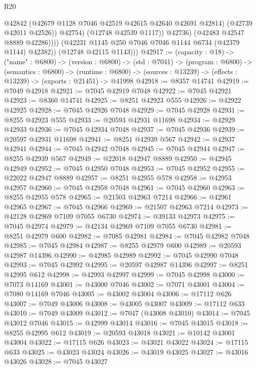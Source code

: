 \begin{lexlean}{R20}
\begin{coremodule}
{                        @42842
                        (@42679 @1128 @7046 @42519 @42615 @42640 @42691 @42814)
                        (@42739 @42011 @42526))
                      @42754)
                    (@12748 @42539 @1117))
                  @42736)
                (@42483 @42547 @8889 @42286))))
          (@42231 @1145 @250 @7046 @7046 @1144 @6734 (@42379 @1144) @42382))
        (@12748 @42115 @1143)))
@42917 := (capacity : @18) ->
  ("name" : @6800) ->
  (version : @6800) ->
  (std : @7041) ->
  (program : @6800) ->
  (semantics : @6800) ->
  (runtime : @6800) -> (sources : @13239) -> (effects : @13239) -> (exports : @21451) -> @41998
@42918 := @8357 @14741
@42919 := @7049 @42918
@42921 := @7045 @42919 @7048
@42922 := @7045 @42921
@42923 := @8360 @14741
@42925 := @8251 @42923 @555
@42926 := @42922 @42925
@42928 := @7045 @42926 @7048
@42929 := @7045 @42928
@42931 := @8255 @42923 @555
@42933 := @20593 @42931 @11698
@42934 := @42929 @42933
@42936 := @7045 @42934 @7048
@42937 := @7045 @42936
@42939 := @20597 @42931 @11698
@42941 := @8251 @42939 @567
@42942 := @42937 @42941
@42944 := @7045 @42942 @7048
@42945 := @7045 @42944
@42947 := @8255 @42939 @567
@42949 := @22018 @42947 @8889
@42950 := @42945 @42949
@42952 := @7045 @42950 @7048
@42953 := @7045 @42952
@42955 := @22022 @42947 @8889
@42957 := @8251 @42955 @578
@42958 := @42953 @42957
@42960 := @7045 @42958 @7048
@42961 := @7045 @42960
@42963 := @8255 @42955 @578
@42965 := @21503 @42963 @7214
@42966 := @42961 @42965
@42967 := @7045 @42966
@42969 := @21507 @42963 @7214
@42973 := @42128 @42969 @7109 @7055 @6730
@42974 := @39133 @42973
@42975 := @7045 @42974
@42979 := @42134 @42969 @7109 @7055 @6730
@42981 := @8251 @42979 @600
@42982 := @7085 @42981
@42984 := @7045 @42982 @7048
@42985 := @7045 @42984
@42987 := @8255 @42979 @600
@42989 := @20593 @42987 @14396
@42990 := @42985 @42989
@42992 := @7045 @42990 @7048
@42993 := @7045 @42992
@42995 := @20597 @42987 @14396
@42997 := @8251 @42995 @612
@42998 := @42993 @42997
@42999 := @7045 @42998
@43000 := @7073 @14169
@43001 := @43000 @7046
@43002 := @7071 @43001
@43004 := @7080 @14169 @7046
@43005 := @43002 @43004
@43006 := @17112 @626
@43007 := @7049 @43006
@43008 := @43005 @43007
@43009 := @17112 @633
@43010 := @7049 @43009
@43012 := @7047 (@43008 @43010)
@43014 := @7045 @43012 @7046
@43015 := @42999 @43014
@43016 := @7045 @43015
@43018 := @8255 @42995 @612
@43019 := @20593 @43018
@43021 := @10142 @43001 @43004
@43022 := @17115 @626
@43023 := @43021 @43022
@43024 := @17115 @633
@43025 := @43023 @43024
@43026 := @43019 @43025
@43027 := @43016 @43026
@43028 := @7045 @43027
}
\end{coremodule}
\end{lexlean}
